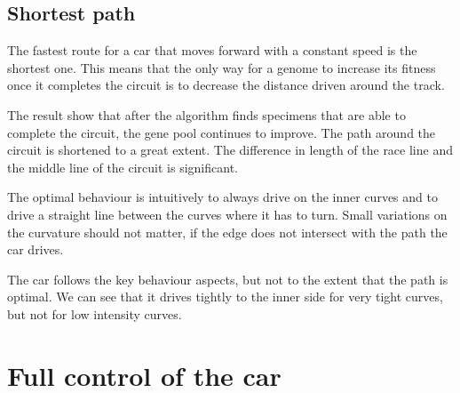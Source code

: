 

\subsection{Shortest path}

The fastest route for a car that moves forward with a constant speed is the shortest one. This means that the only way for a genome to increase its fitness once it completes the circuit is to decrease the distance driven around the track.  

The result show that after the algorithm finds specimens that are able to complete the circuit, the gene pool continues to improve. The path around the circuit is shortened to a great extent. The difference in length of the race line and the middle line of the circuit is significant. 

The optimal behaviour is intuitively to always drive on the inner curves and to drive a straight line between the curves where it has to turn. Small variations on the curvature should not matter, if the edge does not intersect with the path the car drives.

The car follows the key behaviour aspects, but not to the extent that the path is optimal. We can see that it drives tightly to the inner side for very tight curves, but not for low intensity curves.



\section{Full control of the car}



